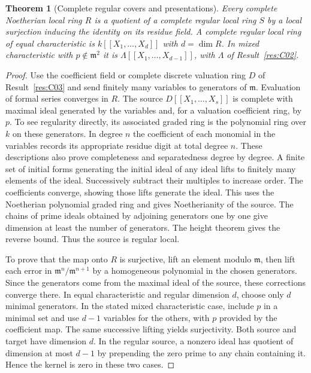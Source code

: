 \documentclass[11pt,oneside,openany]{book}
\newtheorem{theorem}{Theorem}[chapter]
\theoremstyle{definition}
\theoremstyle{remark}
\begin{document}
\begin{theorem}[Complete regular covers and presentations]\label{res:C04}
Every complete Noetherian local ring \(R\) is a quotient of a
complete regular local ring \(S\) by a local surjection inducing
the identity on its residue field. A complete regular local ring
of equal characteristic is \(k[[X_1,\ldots,X_d]]\) with \(d=\dim R\).
In mixed characteristic with \(p\notin\mathfrak m^2\) it is
\(\Lambda[[X_1,\ldots,X_{d-1}]]\), with \(\Lambda\) of
Result~\ref{res:C02}.
\end{theorem}
\begin{proof}
Use the coefficient field or complete discrete valuation ring \(D\)
of Result~\ref{res:C03} and send finitely many variables to generators
of \(\mathfrak m\). Evaluation of formal series converges in \(R\).
The source \(D[[X_1,\ldots,X_s]]\) is complete with maximal ideal
generated by the variables and, for a valuation coefficient ring,
by \(p\). To see regularity directly, its associated graded ring is
the polynomial ring over \(k\) on these generators. In degree \(n\)
the coefficient of each monomial in the variables records its
appropriate residue digit at total degree \(n\). These descriptions
also prove completeness and separatedness degree by degree.
A finite set of initial forms generating the initial ideal of any
ideal lifts to finitely many elements of the ideal. Successively
subtract their multiples to increase order. The coefficients
converge, showing those lifts generate the ideal. This uses the
Noetherian polynomial graded ring and gives Noetherianity of the
source. The chains of prime ideals obtained by adjoining generators
one by one give dimension at least the number of generators.
The height theorem gives the reverse bound. Thus the source is
regular local.

To prove that the map onto \(R\) is surjective, lift an element modulo
\(\mathfrak m\), then lift each error in
\(\mathfrak m^n/\mathfrak m^{n+1}\) by a homogeneous polynomial
in the chosen generators. Since the generators come from the
maximal ideal of the source, these corrections converge there.
In equal characteristic and regular dimension \(d\), choose only
\(d\) minimal generators. In the stated mixed characteristic case,
include \(p\) in a minimal set and use \(d-1\) variables for the
others, with \(p\) provided by the coefficient map. The same
successive lifting yields surjectivity. Both source and target have
dimension \(d\). In the regular source, a nonzero ideal has quotient
of dimension at most \(d-1\) by prepending the zero prime to any
chain containing it. Hence the kernel is zero in these two cases.
\end{proof}
\end{document}
